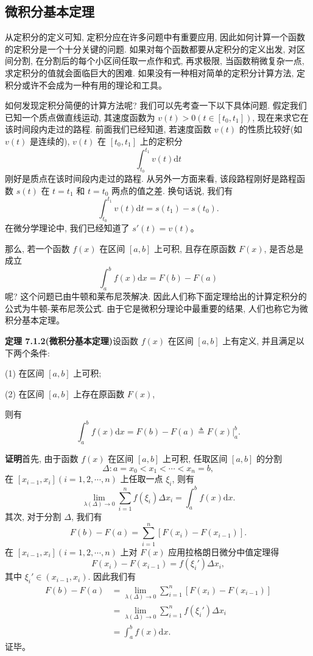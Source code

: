 \documentclass[UTF8, 12pt, fontset=fandol, oneside]{ctexart}
\begin{document}
\subsection{微积分基本定理}

从定积分的定义可知, 定积分应在许多问题中有重要应用, 因此如何计算一个函数的定积分是一个十分关键的问题. 如果对每个函数都要从定积分的定义出发, 对区间分割, 在分割后的每个小区间任取一点作和式, 再求极限, 当函数稍微复杂一点, 求定积分的值就会面临巨大的困难. 如果没有一种相对简单的定积分计算方法, 定积分或许不会成为一种有用的理论和工具。

如何发现定积分简便的计算方法呢? 我们可以先考查一下以下具体问题. 假定我们已知一个质点做直线运动, 其速度函数为 $v(t)>0(t\in[t_0,t_1])$, 现在来求它在该时间段内走过的路程. 前面我们已经知道, 若速度函数 $v(t)$ 的性质比较好(如 $v(t)$ 是连续的), $v(t)$ 在 $[t_0,t_1]$ 上的定积分
\[
  \int_{t_0}^{t_1}v(t)\mathrm dt
\]
刚好是质点在该时间段内走过的路程. 从另外一方面来看, 该段路程刚好是路程函数 $s(t)$ 在 $t=t_1$ 和 $t=t_0$ 两点的值之差. 换句话说, 我们有
\[
  \int_{t_0}^{t_1}v(t)\mathrm dt=s(t_1)-s(t_0).
\]
在微分学理论中, 我们已经知道了 $s'(t)=v(t)$。

那么, 若一个函数 $f(x)$ 在区间 $[a,b]$ 上可积, 且存在原函数 $F(x)$, 是否总是成立
\[
  \int_a^b f(x)\mathrm dx=F(b)-F(a)
\]
呢? 这个问题已由牛顿和莱布尼茨解决. 因此人们称下面定理给出的计算定积分的公式为牛顿-莱布尼茨公式. 由于它是微积分理论中最重要的结果, 人们也称它为微积分基本定理。

\noindent\textbf{定理 7.1.2(微积分基本定理)}\quad 设函数 $f(x)$ 在区间 $[a,b]$ 上有定义, 并且满足以下两个条件:

(1) 在区间 $[a,b]$ 上可积;

(2) 在区间 $[a,b]$ 上存在原函数 $F(x)$,

则有
\begin{equation}
  \int_a^b f(x)\mathrm dx=F(b)-F(a)\triangleq F(x)\big|_a^b.
  \tag{7.1.5}
\end{equation}

\noindent\textbf{证明}\quad 首先, 由于函数 $f(x)$ 在区间 $[a,b]$ 上可积, 任取区间 $[a,b]$ 的分割
\[
  \Delta:a=x_0<x_1<\cdots<x_n=b,
\]
在 $[x_{i-1},x_i](i=1,2,\cdots,n)$ 上任取一点 $\xi_i$, 则有
\[
  \lim_{\lambda(\Delta)\to0}\sum_{i=1}^n f(\xi_i)\Delta x_i=\int_a^b f(x)\mathrm dx.
\]
其次, 对于分割 $\Delta$, 我们有
\[
  F(b)-F(a)=\sum_{i=1}^n[F(x_i)-F(x_{i-1})].
\]
在 $[x_{i-1},x_i](i=1,2,\cdots,n)$ 上对 $F(x)$ 应用拉格朗日微分中值定理得
\[
  F(x_i)-F(x_{i-1})=f(\xi_i')\Delta x_i,
\]
其中 $\xi_i'\in(x_{i-1},x_i)$. 因此我们有
\[
\begin{aligned}
  F(b)-F(a)
  &=\lim_{\lambda(\Delta)\to0}\sum_{i=1}^n[F(x_i)-F(x_{i-1})]\\
  &=\lim_{\lambda(\Delta)\to0}\sum_{i=1}^n f(\xi_i')\Delta x_i\\
  &=\int_a^b f(x)\mathrm dx.
\end{aligned}
\]
证毕。
\end{document}
